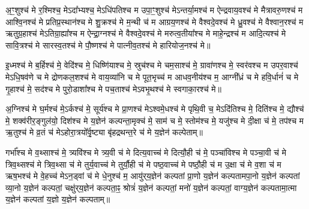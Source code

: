 

अ॒ꣳ॒शुश्च॑ मे र॒श्मिश्च॒ मेऽदा᳚भ्यश्च॒ मेऽधि॑पतिश्च म उपा॒ꣳ॒शुश्च॑ मेऽन्तर्या॒मश्च॑ म ऐन्द्रवाय॒वश्च॑ मे मैत्रावरु॒णश्च॑ म आश्वि॒नश्च॑ मे प्रतिप्र॒स्थान॑श्च मे शु॒क्रश्च॑ मे म॒न्थी च॑ म आग्रय॒णश्च॑ मे वैश्वदे॒वश्च॑ मे ध्रु॒वश्च॑ मे वैश्वान॒रश्च॑ म ऋतुग्र॒हाश्च॑ मेऽतिग्रा॒ह्या᳚श्च म ऐन्द्रा॒ग्नश्च॑ मे वैश्वदे॒वश्च॑ मे मरुत्व॒तीया᳚श्च मे माहे॒न्द्रश्च॑ म आदि॒त्यश्च॑ मे सावि॒त्रश्च॑ मे सारस्व॒तश्च॑ मे पौ॒ष्णश्च॑ मे पात्नीव॒तश्च॑ मे हारियोज॒नश्च॑ मे॥ 



इ॒ध्मश्च॑ मे ब॒र्हिश्च॑ मे॒ वेदि॑श्च मे॒ धिष्णि॑याश्च मे॒ स्रुच॑श्च मे चम॒साश्च॑ मे॒ ग्रावा॑णश्च मे॒ स्वर॑वश्च म उपर॒वाश्च॑ मेऽधि॒षव॑णे च मे द्रोणकल॒शश्च॑ मे वाय॒व्या॑नि च मे पूत॒भृच्च॑ म आधव॒नीय॑श्च म॒ आग्नी᳚ध्रं च मे हवि॒र्धानं॑ च मे गृ॒हाश्च॑ मे॒ सद॑श्च मे पुरो॒डाशा᳚श्च मे पच॒ताश्च॑ मेऽवभृ॒थश्च॑ मे स्वगाका॒रश्च॑ मे॥ 



अ॒ग्निश्च॑ मे घ॒र्मश्च॑ मे॒ऽर्कश्च॑ मे॒ सूर्य॑श्च मे प्रा॒णश्च॑ मेऽश्वमे॒धश्च॑ मे पृथि॒वी च॒ मेऽदि॑तिश्च मे॒ दिति॑श्च मे॒ द्यौश्च॑ मे॒ शक्व॑रीर॒ङ्गुल॑यो॒ दिश॑श्च मे य॒ज्ञेन॑ कल्पन्ता॒मृक्च॑ मे॒ साम॑ च मे॒ स्तोम॑श्च मे॒ यजु॑श्च मे दी॒क्षा च॑ मे॒ तप॑श्च म ऋ॒तुश्च॑ मे व्र॒तं च॑ मेऽहोरा॒त्रयो᳚र्वृ॒ष्ट्या बृ॑हद्रथन्त॒रे च॑ मे य॒ज्ञेन॑ कल्पेताम्॥ 



गर्भा᳚श्च मे व॒थ्साश्च॑ मे॒ त्र्यवि॑श्च मे त्र्य॒वी च॑ मे दित्य॒वाच्च॑ मे दित्यौ॒ही च॑ मे॒ पञ्चा॑विश्च मे पञ्चा॒वी च॑ मे त्रिव॒थ्सश्च॑ मे त्रिव॒थ्सा च॑ मे तुर्य॒वाच्च॑ मे तुर्यौ॒ही च॑ मे पष्ठ॒वाच्च॑ मे पष्ठौ॒ही च॑ म उ॒क्षा च॑ मे व॒शा च॑ म ऋष॒भश्च॑ मे वे॒हच्च॑ मेऽन॒ड्वां च॑ मे धे॒नुश्च॑ म॒ आयु॑र्‌य॒ज्ञेन॑ कल्पतां प्रा॒णो य॒ज्ञेन॑ कल्पतामपा॒नो य॒ज्ञेन॑ कल्पतां व्या॒नो य॒ज्ञेन॑ कल्पतां॒ चक्षु॑र्‌य॒ज्ञेन॑ कल्पता॒ꣴ॒ श्रोत्रं॑ य॒ज्ञेन॑ कल्पतां॒ मनो॑ य॒ज्ञेन॑ कल्पतां॒ वाग्य॒ज्ञेन॑ कल्पतामा॒त्मा य॒ज्ञेन॑ कल्पतां य॒ज्ञो य॒ज्ञेन॑ कल्पताम्॥ 

